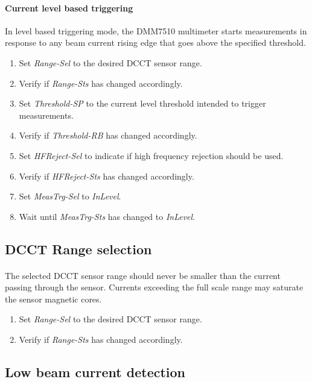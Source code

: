 \documentclass[openany]{article}
\begin{document}
		\paragraph{Current level based triggering} In level based triggering mode, the DMM7510 multimeter starts measurements in response to any beam current rising edge that goes above the specified threshold.

			\begin{enumerate}
				\item Set \emph{Range-Sel} to the desired DCCT sensor range.
				\item Verify if \emph{Range-Sts} has changed accordingly.
				\item Set \emph{Threshold-SP} to the current level threshold intended to trigger measurements.
				\item Verify if \emph{Threshold-RB} has changed accordingly.
				\item Set \emph{HFReject-Sel} to indicate if high frequency rejection should be used.
				\item Verify if \emph{HFReject-Sts} has changed accordingly.
				\item Set \emph{MeasTrg-Sel} to \emph{InLevel}.
				\item Wait until \emph{MeasTrg-Sts} has changed to \emph{InLevel}.
			\end{enumerate}

	\subsection{DCCT Range selection}

		\paragraph{} The selected DCCT sensor range should never be smaller than the current passing through the sensor. Currents exceeding the full scale range may saturate the sensor magnetic cores.

			\begin{enumerate}
				\item Set \emph{Range-Sel} to the desired DCCT sensor range.
				\item Verify if \emph{Range-Sts} has changed accordingly.
			\end{enumerate}

	\subsection{Low beam current detection}
\end{document}
